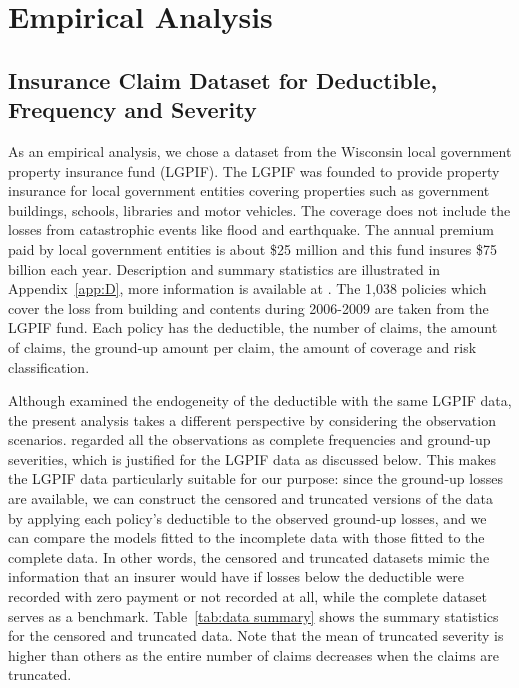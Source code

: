 \section{Empirical Analysis}\label{sec:empirical}
\subsection{Insurance Claim Dataset for Deductible, Frequency and Severity}

As an empirical analysis, we chose a dataset from the Wisconsin local government property insurance fund (LGPIF). The LGPIF was founded to provide property insurance for local government entities covering properties such as government buildings, schools, libraries and motor vehicles. The coverage does not include the losses from catastrophic events like flood and earthquake. The annual premium paid by local government entities is about \$25 million and this fund insures \$75  billion each year. Description and summary statistics are illustrated in Appendix~\ref{app:D}, more information is {available at} \cite{lgpifwebpage}. The 1,038 policies which cover the loss from building and contents during 2006-2009 are taken from the LGPIF fund. Each policy has the deductible, the number of claims, the amount of claims, the ground-up amount per claim, the amount of coverage and risk classification. %

{Although \citet{shi2022copula} examined the endogeneity of the deductible with the same LGPIF data, the present analysis takes a different perspective by considering the observation scenarios. \citet{shi2022copula} regarded all the observations as complete frequencies and ground-up severities, which is justified for the LGPIF data as discussed below. This makes the LGPIF data particularly suitable for our purpose: since the ground-up losses are available, we can construct the censored and truncated versions of the data by applying each policy's deductible to the observed ground-up losses, and we can compare the models fitted to the incomplete data with those fitted to the complete data. In other words, the censored and truncated datasets mimic the information that an insurer would have if losses below the deductible were recorded with zero payment or not recorded at all, while the complete dataset serves as a benchmark.} Table~\ref{tab:data summary} shows the summary statistics for the censored and truncated data. Note that the mean of truncated severity is higher than others as the entire number of claims decreases when the claims are truncated.

